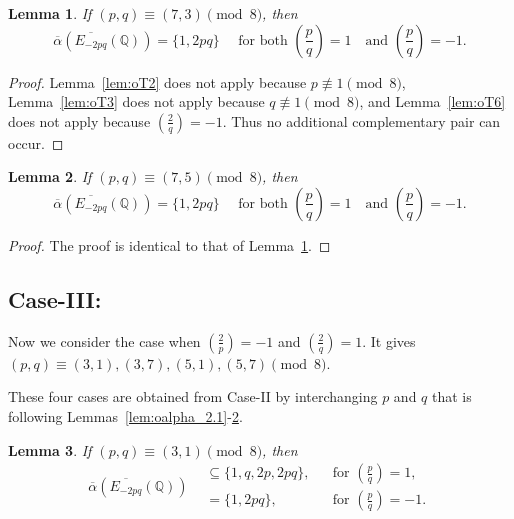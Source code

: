 \documentclass[12pt]{amsart}
\newcommand{\bbQ}{\mathbb{Q}}
\newcommand{\legendre}[2]{\genfrac{(}{)}{}{}{#1}{#2}}
\numberwithin{equation}{section}
\newtheorem{lem}{Lemma}[section]
\theoremstyle{definition}
\begin{document}


\begin{lem}
\label{lem:oalpha_2.3}
If $(p,q)\equiv (7,3)\pmod 8$, then
\[
\overline{\alpha}\left(\overline{E_{-2pq}}(\bbQ)\right)
= \{1,2pq\} \quad \text{ for both } \legendre{p}{q}=1 \quad \text{and } \legendre{p}{q}=-1.
\]
\end{lem}


\begin{proof}
Lemma~\ref{lem:oT2} does not apply because $p\not\equiv1\pmod8$,
Lemma~\ref{lem:oT3} does not apply because $q\not\equiv1\pmod8$, and
Lemma~\ref{lem:oT6} does not apply because $\legendre{2}{q}=-1$.
Thus no additional complementary pair can occur.
\end{proof}


\begin{lem}
\label{lem:oalpha_2.4}
If $(p,q)\equiv (7,5)\pmod 8$, then
\[
\overline{\alpha}\left(\overline{E_{-2pq}}(\bbQ)\right)
= \{1,2pq\} \quad \text{ for both } \legendre{p}{q}=1 \quad \text{and } \legendre{p}{q}=-1.
\]
\end{lem}



\begin{proof}
The proof is identical to that of Lemma~\ref{lem:oalpha_2.3}.
\end{proof}


\subsection*{Case-III:} Now we consider the case when $\legendre{2}{p}=-1$ and $\legendre{2}{q}=1$. It gives $(p,q)\equiv (3,1),(3,7),(5,1),(5,7)\pmod 8$.

These four cases are obtained from Case-II by interchanging $p$ and $q$ that is following Lemmas~\ref{lem:oalpha_2.1}-\ref{lem:oalpha_2.4}.


\begin{lem}
\label{lem:oalpha_3.1}
If $(p,q)\equiv (3,1)\pmod 8$, then
\[
\overline{\alpha}\left(\overline{E_{-2pq}}(\bbQ)\right)
\begin{aligned}
&\subseteq \{1,q,2p,2pq\},
&& \text{for } \legendre{p}{q}=1,\\
&= \{1,2pq\},
&& \text{for } \legendre{p}{q}=-1.
\end{aligned}
\]
\end{lem}
\end{document}

